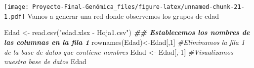 \documentclass[
]{article}
\newenvironment{Shaded}{\begin{snugshade}}{\end{snugshade}}
\newcommand{\CommentTok}[1]{\textcolor[rgb]{0.56,0.35,0.01}{\textit{#1}}}
\newcommand{\DecValTok}[1]{\textcolor[rgb]{0.00,0.00,0.81}{#1}}
\newcommand{\DocumentationTok}[1]{\textcolor[rgb]{0.56,0.35,0.01}{\textbf{\textit{#1}}}}
\newcommand{\FunctionTok}[1]{\textcolor[rgb]{0.00,0.00,0.00}{#1}}
\newcommand{\NormalTok}[1]{#1}
\newcommand{\OtherTok}[1]{\textcolor[rgb]{0.56,0.35,0.01}{#1}}
\newcommand{\SpecialCharTok}[1]{\textcolor[rgb]{0.00,0.00,0.00}{#1}}
\newcommand{\StringTok}[1]{\textcolor[rgb]{0.31,0.60,0.02}{#1}}
\begin{document}
\texttt{[image: Proyecto-Final-Genómica\_files/figure-latex/unnamed-chunk-21-1.pdf]}
Vamos a generar una red donde observemos los grupos de edad

\begin{Shaded}
\begin{Highlighting}[]
\NormalTok{Edad }\OtherTok{\textless{}{-}} \FunctionTok{read.csv}\NormalTok{(}\StringTok{"edad.xlsx {-} Hoja1.csv"}\NormalTok{)}
\DocumentationTok{\#\# Establecemos los nombres de las columnas en la fila 1}
\FunctionTok{rownames}\NormalTok{(Edad)}\OtherTok{\textless{}{-}}\NormalTok{Edad[,}\DecValTok{1}\NormalTok{]}
\CommentTok{\#Eliminamos la fila 1 de la base de datos que contiene nombres}
\NormalTok{Edad }\OtherTok{\textless{}{-}}\NormalTok{ Edad[,}\SpecialCharTok{{-}}\DecValTok{1}\NormalTok{]}
\CommentTok{\#Visualizamos nuestra base de datos}
\NormalTok{Edad}
\end{Highlighting}
\end{Shaded}
\end{document}
